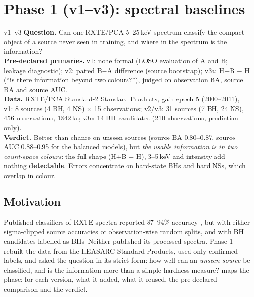 \chapter{Phase 1 (v1--v3): spectral baselines}\label{ch:phase1}

\begin{glance}{v1--v3}
\textbf{Question.} Can one RXTE/PCA 5--25\,keV spectrum classify the compact object of a source never seen in training,
and where in the spectrum is the information? \\
\textbf{Pre-declared primaries.} v1: none formal (LOSO evaluation of A and B; leakage diagnostic); v2: paired B$-$A
difference (source bootstrap); v3a: H+B $-$ H (``is there information beyond two colours?''), judged on observation BA,
source BA and source AUC. \\
\textbf{Data.} RXTE/PCA Standard-2 Standard Products, gain epoch 5 (2000--2011); v1: 8 sources (4 BH, 4 NS) $\times$ 15
observations; v2/v3: 31 sources (7 BH, 24 NS), 456 observations, 1842\,ks; v3c: 14 BH candidates (210 observations,
prediction only). \\
\textbf{Verdict.} Better than chance on unseen sources (source BA 0.80--0.87, source AUC 0.88--0.95 for the balanced
models), but \emph{the usable information is in two count-space colours}: the full shape (H+B $-$ H), 3--5\,keV and
intensity add nothing \textbf{detectable}. Errors concentrate on hard-state BHs and hard NSs, which overlap in colour.
\end{glance}

\section{Motivation}
Published classifiers of RXTE spectra reported 87--94\% accuracy \citep{Pattnaik2021,Garg2026}, but with either
sigma-clipped source accuracies or observation-wise random splits, and with BH candidates labelled as BHs. Neither
published its processed spectra. Phase 1 rebuilt the data from the HEASARC Standard Products, used only confirmed labels,
and asked the question in its strict form: how well can an \emph{unseen source} be classified, and is the information more
than a simple hardness measure?
 maps the phase: for each version, what it added, what it reused, the pre-declared comparison and the
verdict.

